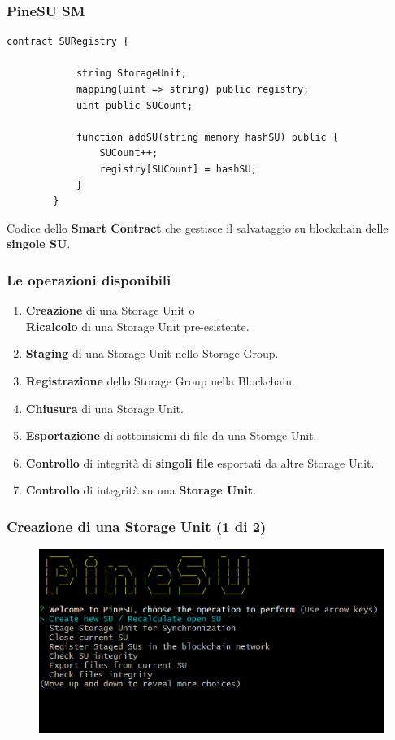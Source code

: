 \documentclass{beamer}
\begin{document}
\begin{frame}[fragile]
	\frametitle{PineSU SM}
	\begin{lstlisting}[language=Solidity, numbers=none]
		contract SURegistry {
		
			string StorageUnit;
			mapping(uint => string) public registry;
			uint public SUCount;
		
			function addSU(string memory hashSU) public {
				SUCount++;
				registry[SUCount] = hashSU;
			}
		}
	\end{lstlisting}
	Codice dello \textbf{Smart Contract} che gestisce il salvataggio su blockchain delle \textbf{singole SU}.
\end{frame}

\begin{frame}
	\frametitle{Le operazioni disponibili}
	\begin{enumerate}%
		\item \textbf{Creazione} di una Storage Unit o \\ \textbf{Ricalcolo} di una Storage Unit pre-esistente.
		\item \textbf{Staging} di una Storage Unit nello Storage Group.
		\item \textbf{Registrazione} dello Storage Group nella Blockchain.
		\item \textbf{Chiusura} di una Storage Unit.
		\item \textbf{Esportazione} di sottoinsiemi di file da una Storage Unit.
		\item \textbf{Controllo} di integrità di \textbf{singoli file} esportati da altre Storage Unit.
		\item \textbf{Controllo} di integrità su una \textbf{Storage Unit}.
	\end{enumerate}
\end{frame}


\begin{frame}
	\frametitle{Creazione di una Storage Unit (1 di 2)}
	\begin{figure}
		\includegraphics[width=\textwidth]{figures/ops/1.png}
	\end{figure}
\end{frame}
\end{document}
